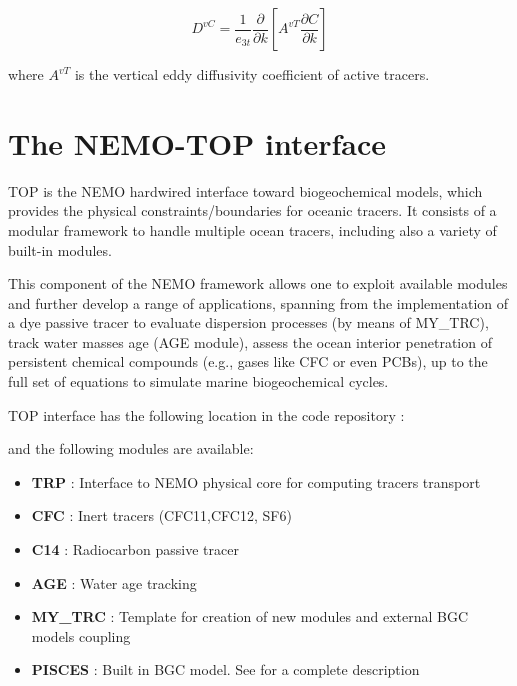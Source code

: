 \documentclass[../main/TOP_manual]{subfiles}
\begin{document}
\begin{equation}
D^{vC} =  \frac{1}{e_{3t}} \frac{\partial}{\partial k} \left[  A^{vT} \frac{\partial C}{\partial k} \right]
\label{Eq_trczdf}
\end{equation}

where $A^{vT}$ is the vertical eddy diffusivity coefficient of active tracers.

\section{The NEMO-TOP interface}
\label{sec:TopInt}

TOP is the NEMO hardwired interface toward biogeochemical models, which provides the physical constraints/boundaries for oceanic tracers.
It consists of a modular framework to handle multiple ocean tracers, including also a variety of built-in modules.

This component of the NEMO framework allows one to exploit available modules  and further develop a range of applications, spanning from the implementation of a dye passive tracer to evaluate dispersion processes (by means of MY\_TRC), track water masses age (AGE module), assess the ocean interior penetration of persistent chemical compounds (e.g., gases like CFC or even PCBs), up to the full set of equations to simulate marine biogeochemical cycles.

TOP interface has the following location in the code repository : 

and the following modules are available:

\begin{itemize}
        \item \textbf{TRP}    	    :    Interface to NEMO physical core for computing tracers transport
        \item \textbf{CFC}	    :    Inert tracers (CFC11,CFC12, SF6)
        \item \textbf{C14}	    :    Radiocarbon passive tracer
        \item \textbf{AGE}	    :    Water age tracking
        \item \textbf{MY\_TRC}  :	Template for creation of new modules and external BGC models coupling
        \item \textbf{PISCES}    :	 Built in BGC model. See \cite{aumont_2015} for a complete description
\end{itemize}
\end{document}
